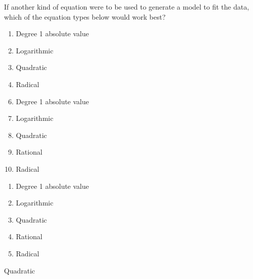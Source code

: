  
If another kind of equation were to be used to generate a model to fit the data, which of the equation types below would work best?



\ifsat
	\begin{enumerate}[label=\Alph*)]
		\item Degree 1 absolute value
		\item Logarithmic
		\item Quadratic %
		\item Radical
	\end{enumerate}
\else
\fi

\ifacteven
	\begin{enumerate}[label=\textbf{\Alph*.},itemsep=\fill,align=left]
		\setcounter{enumii}{5}
		\item Degree 1 absolute value
		\item Logarithmic
		\item Quadratic %
		\addtocounter{enumii}{1}
		\item Rational
		\item Radical
	\end{enumerate}
\else
\fi

\ifactodd
	\begin{enumerate}[label=\textbf{\Alph*.},itemsep=\fill,align=left]
		\item Degree 1 absolute value
		\item Logarithmic
		\item Quadratic %
		\item Rational
		\item Radical
	\end{enumerate}
\else
\fi

\ifgridin
 Quadratic %
		
\else
\fi

